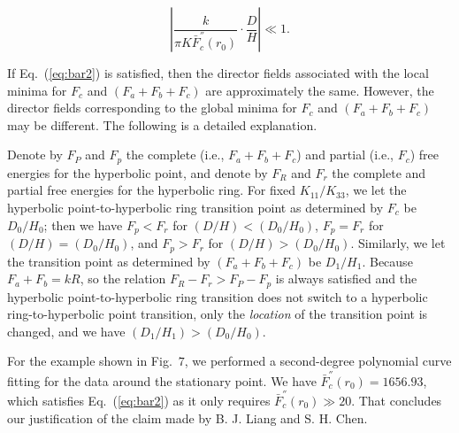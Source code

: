 \documentclass[nottitlepage]{article}
\begin{document}
\begin{equation}\label{eq:bar2}
 \left|\frac{k}{\pi K \bar{F}_c^{''} (r_0)}\cdot\frac{D}{H}\right|\ll 1.
 \end{equation}
 
If Eq.~(\ref{eq:bar2}) is satisfied, then the director fields associated with the local minima for $F_c$ and $(F_a+F_b+F_c)$ are approximately the same. However, the director fields corresponding to the global minima for $F_c$ and $(F_a+F_b+F_c)$ may be different. The following is a detailed explanation.

Denote by $F_P$ and $F_p$ the complete (i.e., $F_a+F_b+F_c$) and partial (i.e., $F_c$) free energies for the hyperbolic point, and denote by $F_R$ and $F_r$ the complete and partial free energies for the hyperbolic ring.  For fixed $K_{11}/K_{33}$, we let the hyperbolic point-to-hyperbolic ring transition point as determined by $F_c$ be $D_0/H_0$; then we have $F_p<F_r$ for $(D/H)<(D_0/H_0)$, $F_p=F_r$ for $(D/H)=(D_0/H_0)$, and $F_p>F_r$ for $(D/H)>(D_0/H_0)$. Similarly, we let the transition point as determined by $(F_a+F_b+F_c)$ be $D_1/H_1$. Because $F_a+F_b=kR$, so the relation $F_R-F_r>F_P-F_p$ is always satisfied and the hyperbolic point-to-hyperbolic ring transition does not switch to a hyperbolic ring-to-hyperbolic point transition, only the {\it location} of the transition point is changed, and we have $(D_1/H_1)>(D_0/H_0)$. 

For the example shown in Fig.~$7$, we performed a second-degree polynomial curve fitting for the data around the stationary point. We have %
$\bar{F}_c^{''} (r_0)=1656.93$, which satisfies Eq.~(\ref{eq:bar2}) as it only requires $\bar{F}_c^{''}  (r_0)\gg 20$. That concludes our justification of the claim made by B. J. Liang and S. H. Chen. 






\end{document}
